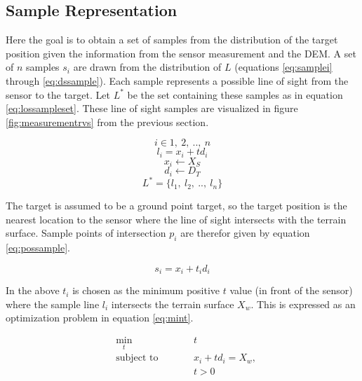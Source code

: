 \documentclass[journal]{IEEEtran}
\begin{document}
\subsection{Sample Representation} \label{particlemodel}
Here the goal is to obtain a set of samples from the distribution of the target position given the information from the sensor measurement and the DEM. A set of $n$ samples $s_i$ are drawn from the distribution of $L$ (equations \ref{eq:samplei} through \ref{eq:dssample}). Each sample represents a possible line of sight from the sensor to the target. Let $L^*$ be the set containing these samples as in equation \ref{eq:lossampleset}. These line of sight samples are visualized in figure \ref{fig:measurementrvs} from the previous section.

\begin{dmath} \label{eq:samplei}
    i \in 1,\ 2,\ ..,\ n
\end{dmath}
\begin{dmath} \label{eq:lossample}
    {l_i = x_i + t d_i}
\end{dmath}
\begin{dmath} \label{eq:xssample}
    {x_i \leftarrow X_S}
\end{dmath}
\begin{dmath} \label{eq:dssample}
    {d_i \leftarrow D_T}
\end{dmath}
\begin{dmath} \label{eq:lossampleset}
    {L^* = \{ l_1,\ l_2,\ ..,\ l_n\}}
\end{dmath}

The target is assumed to be a ground point target, so the target position is the nearest location to the sensor where the line of sight intersects with the terrain surface. Sample points of intersection $p_i$ are therefor given by equation \ref{eq:possample}. 

\begin{dmath} \label{eq:possample}
    {s_i = x_i + t_i d_i}
\end{dmath}

In the above $t_i$ is chosen as the minimum positive $t$ value (in front of the sensor) where the sample line $l_i$ intersects the terrain surface $X_w$. This is expressed as an optimization problem in equation \ref{eq:mint}.

\begin{subequations}\label{eq:mint}
\begin{alignat}{2}
&\!\min_{t}          &\qquad& t\\
&\text{subject to} &      & x_i + t d_i = X_w,\\
&                  &      & t > 0
\end{alignat}
\end{subequations}
\end{document}
